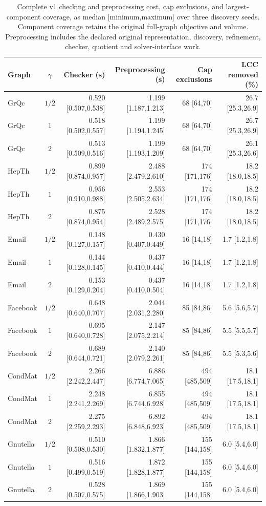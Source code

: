 \documentclass[sigconf,anonymous,review]{acmart}
\newcommand{\1}{\mathbf{1}}
\begin{document}
\begin{table}[t]
\caption{Complete v1 checking and preprocessing cost, cap exclusions, and largest-component coverage, as median [minimum,maximum] over three discovery seeds. Component coverage retains the original full-graph objective and volume. Preprocessing includes the declared original representation, discovery, refinement, checker, quotient and solver-interface work.}\label{tab:cost-cap-details}
\centering\small
\begin{tabular}{lcrrrr}\toprule
Graph & $\gamma$ & Checker (s) & Preprocessing (s) & Cap exclusions & LCC removed (\%)\\\midrule
GrQc & $1/2$ & 0.520 [0.507,0.538] & 1.199 [1.187,1.213] & 68 [64,70] & 26.7 [25.3,26.9]\\
GrQc & $1$ & 0.518 [0.502,0.557] & 1.199 [1.194,1.245] & 68 [64,70] & 26.7 [25.3,26.9]\\
GrQc & $2$ & 0.513 [0.509,0.516] & 1.199 [1.193,1.209] & 68 [64,70] & 26.1 [25.3,26.6]\\
HepTh & $1/2$ & 0.899 [0.874,0.957] & 2.488 [2.479,2.610] & 174 [171,176] & 18.2 [18.0,18.5]\\
HepTh & $1$ & 0.956 [0.910,0.988] & 2.553 [2.505,2.634] & 174 [171,176] & 18.2 [18.0,18.5]\\
HepTh & $2$ & 0.875 [0.874,0.954] & 2.528 [2.489,2.575] & 174 [171,176] & 18.2 [18.0,18.5]\\
Email & $1/2$ & 0.148 [0.127,0.157] & 0.430 [0.407,0.449] & 16 [14,18] & 1.7 [1.2,1.8]\\
Email & $1$ & 0.144 [0.128,0.145] & 0.437 [0.410,0.444] & 16 [14,18] & 1.7 [1.2,1.8]\\
Email & $2$ & 0.153 [0.129,0.204] & 0.437 [0.410,0.504] & 16 [14,18] & 1.7 [1.2,1.8]\\
Facebook & $1/2$ & 0.648 [0.640,0.707] & 2.044 [2.031,2.280] & 85 [84,86] & 5.6 [5.6,5.7]\\
Facebook & $1$ & 0.695 [0.640,0.728] & 2.147 [2.075,2.214] & 85 [84,86] & 5.5 [5.5,5.7]\\
Facebook & $2$ & 0.689 [0.644,0.721] & 2.140 [2.079,2.261] & 85 [84,86] & 5.5 [5.3,5.6]\\
CondMat & $1/2$ & 2.266 [2.242,2.447] & 6.886 [6.774,7.065] & 494 [485,509] & 18.1 [17.5,18.1]\\
CondMat & $1$ & 2.248 [2.241,2.269] & 6.855 [6.744,6.928] & 494 [485,509] & 18.1 [17.5,18.1]\\
CondMat & $2$ & 2.275 [2.259,2.293] & 6.892 [6.848,6.923] & 494 [485,509] & 18.1 [17.5,18.1]\\
Gnutella & $1/2$ & 0.510 [0.508,0.530] & 1.866 [1.832,1.877] & 155 [144,158] & 6.0 [5.4,6.0]\\
Gnutella & $1$ & 0.516 [0.499,0.519] & 1.872 [1.828,1.877] & 155 [144,158] & 6.0 [5.4,6.0]\\
Gnutella & $2$ & 0.528 [0.507,0.575] & 1.869 [1.866,1.903] & 155 [144,158] & 6.0 [5.4,6.0]\\
\bottomrule\end{tabular}
\end{table}
\end{document}
